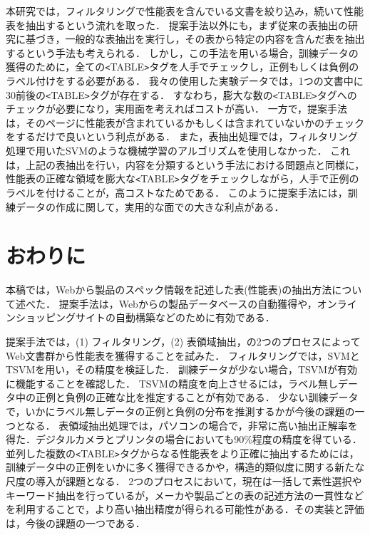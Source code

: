 本研究では，フィルタリングで性能表を含んでいる文書を絞り込み，続いて性能表を抽出するという流れを取った．
提案手法以外にも，まず従来の表抽出の研究に基づき，一般的な表抽出を実行し，その表から特定の内容を含んだ表を抽出するという手法も考えられる．
しかし，この手法を用いる場合，訓練データの獲得のために，全ての\verb+<+TABLE\verb+>+タグを人手でチェックし，正例もしくは負例のラベル付けをする必要がある．
我々の使用した実験データでは，1つの文書中に30前後の\verb+<+TABLE\verb+>+タグが存在する．
すなわち，膨大な数の\verb+<+TABLE\verb+>+タグへのチェックが必要になり，実用面を考えればコストが高い．
一方で，提案手法は，そのページに性能表が含まれているかもしくは含まれていないかのチェックをするだけで良いという利点がある．
また，表抽出処理では，フィルタリング処理で用いたSVMのような機械学習のアルゴリズムを使用しなかった．
これは，上記の表抽出を行い，内容を分類するという手法における問題点と同様に，性能表の正確な領域を膨大な\verb+<+TABLE\verb+>+タグをチェックしながら，人手で正例のラベルを付けることが，高コストなためである．
このように提案手法には，訓練データの作成に関して，実用的な面での大きな利点がある．



\section{おわりに}
本稿では，Webから製品のスペック情報を記述した表(性能表)の抽出方法について述べた．
提案手法は，Webからの製品データベースの自動獲得や，オンラインショッピングサイトの自動構築などのために有効である．

提案手法では，(1) フィルタリング，(2) 表領域抽出，の2つのプロセスによってWeb文書群から性能表を獲得することを試みた．
フィルタリングでは，SVMとTSVMを用い，その精度を検証した．
訓練データが少ない場合，TSVMが有効に機能することを確認した．
TSVMの精度を向上させるには，ラベル無しデータ中の正例と負例の正確な比を推定することが有効である．
少ない訓練データで，いかにラベル無しデータの正例と負例の分布を推測するかが今後の課題の一つとなる．
表領域抽出処理では，パソコンの場合で，非常に高い抽出正解率を得た．デジタルカメラとプリンタの場合においても90\%程度の精度を得ている．
並列した複数の\verb+<+TABLE\verb+>+タグからなる性能表をより正確に抽出するためには，訓練データ中の正例をいかに多く獲得できるかや，構造的類似度に関する新たな尺度の導入が課題となる．
2つのプロセスにおいて，現在は一括して素性選択やキーワード抽出を行っているが，メーカや製品ごとの表の記述方法の一貫性などを利用することで，より高い抽出精度が得られる可能性がある．その実装と評価は，今後の課題の一つである．

